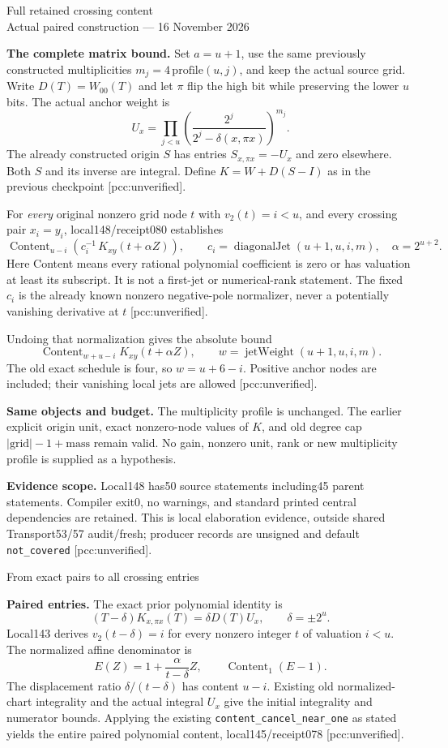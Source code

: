 \documentclass[10pt]{article}
\begin{document}
\begin{center}{\Large Full retained crossing content}\\[4pt]
Actual paired construction --- 16 November 2026\end{center}
\textbf{The complete matrix bound.} Set $a=u+1$, use the same previously
constructed multiplicities $m_j=4\,\mathrm{profile}(u,j)$, and keep the actual
source grid. Write $D(T)=W_{00}(T)$ and let $\pi$ flip the high bit while
preserving the lower $u$ bits. The actual anchor weight is
\[
 U_x=\prod_{j<u}\left(\frac{2^j}{2^j-\delta(x,\pi x)}\right)^{m_j}.
\]
The already constructed origin $S$ has entries $S_{x,\pi x}=-U_x$ and zero
elsewhere. Both $S$ and its inverse are integral. Define
$K=W+D(S-I)$ as in the previous checkpoint [pcc:unverified].

For \emph{every} original nonzero grid node $t$ with $v_2(t)=i<u$, and every
crossing pair $x_i=y_i$, local148/receipt080 establishes
\[
 \operatorname{Content}_{u-i}
 \left(c_i^{-1}\,K_{xy}(t+\alpha Z)\right),\qquad
 c_i=\operatorname{diagonalJet}(u+1,u,i,m),\quad \alpha=2^{u+2}.
\]
Here Content means every rational polynomial coefficient is zero or has
valuation at least its subscript. It is not a first-jet or numerical-rank
statement. The fixed $c_i$ is the already known nonzero negative-pole
normalizer, never a potentially vanishing derivative at $t$
[pcc:unverified].

Undoing that normalization gives the absolute bound
\[
 \operatorname{Content}_{w+u-i}K_{xy}(t+\alpha Z),\qquad
 w=\operatorname{jetWeight}(u+1,u,i,m).
\]
The old exact schedule is four, so $w=u+6-i$. Positive anchor nodes are
included; their vanishing local jets are allowed [pcc:unverified].

\textbf{Same objects and budget.} The multiplicity profile is unchanged.
The earlier explicit origin unit, exact nonzero-node values of $K$, and
old degree cap $|\mathrm{grid}|-1+\mathrm{mass}$ remain valid. No gain,
nonzero unit, rank or new multiplicity profile is supplied as a hypothesis.

\textbf{Evidence scope.} Local148 has50 source statements including45 parent
statements. Compiler exit0, no warnings, and standard printed central
dependencies are retained. This is local elaboration evidence, outside
shared Transport53/57 audit/fresh; producer records are unsigned and default
\texttt{not\_covered} [pcc:unverified].
\newpage
\begin{center}{\Large From exact pairs to all crossing entries}\end{center}
\textbf{Paired entries.} The exact prior polynomial identity is
\[
 (T-\delta)K_{x,\pi x}(T)=\delta D(T)U_x,
 \qquad \delta=\pm2^u.
\]
Local143 derives $v_2(t-\delta)=i$ for every nonzero integer $t$ of valuation
$i<u$. The normalized affine denominator is
\[
 E(Z)=1+\frac{\alpha}{t-\delta}Z,\qquad
 \operatorname{Content}_1(E-1).
\]
The displacement ratio $\delta/(t-\delta)$ has content $u-i$. Existing old
normalized-chart integrality and the actual integral $U_x$ give the initial
integrality and numerator bounds. Applying the existing
\texttt{content\_cancel\_near\_one} as stated yields the entire paired
polynomial content, local145/receipt078 [pcc:unverified].
\end{document}
